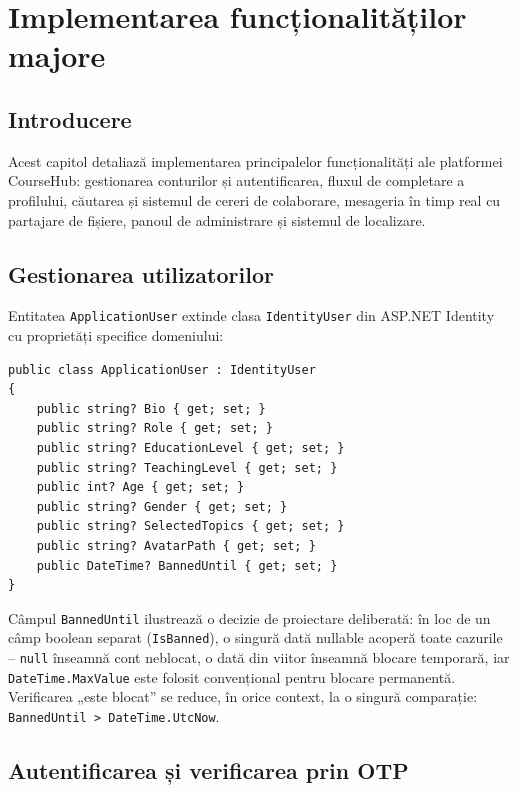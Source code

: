 \chapter{Implementarea funcționalităților majore}

\section{Introducere}

Acest capitol detaliază implementarea principalelor funcționalități ale platformei
CourseHub: gestionarea conturilor și autentificarea, fluxul de completare a
profilului, căutarea și sistemul de cereri de colaborare, mesageria în timp real cu
partajare de fișiere, panoul de administrare și sistemul de localizare.

\section{Gestionarea utilizatorilor}

Entitatea \texttt{ApplicationUser} extinde clasa \texttt{IdentityUser} din
ASP.NET Identity cu proprietăți specifice domeniului:

\begin{lstlisting}[caption={Extinderea entității de utilizator (fragment)}]
public class ApplicationUser : IdentityUser
{
    public string? Bio { get; set; }
    public string? Role { get; set; }
    public string? EducationLevel { get; set; }
    public string? TeachingLevel { get; set; }
    public int? Age { get; set; }
    public string? Gender { get; set; }
    public string? SelectedTopics { get; set; }
    public string? AvatarPath { get; set; }
    public DateTime? BannedUntil { get; set; }
}
\end{lstlisting}

Câmpul \texttt{BannedUntil} ilustrează o decizie de proiectare deliberată: în loc
de un câmp boolean separat (\texttt{IsBanned}), o singură dată nullable acoperă
toate cazurile -- \texttt{null} înseamnă cont neblocat, o dată din viitor înseamnă
blocare temporară, iar \texttt{DateTime.MaxValue} este folosit convențional pentru
blocare permanentă. Verificarea „este blocat” se reduce, în orice context, la o
singură comparație: \texttt{BannedUntil > DateTime.UtcNow}.

\section{Autentificarea și verificarea prin OTP}

